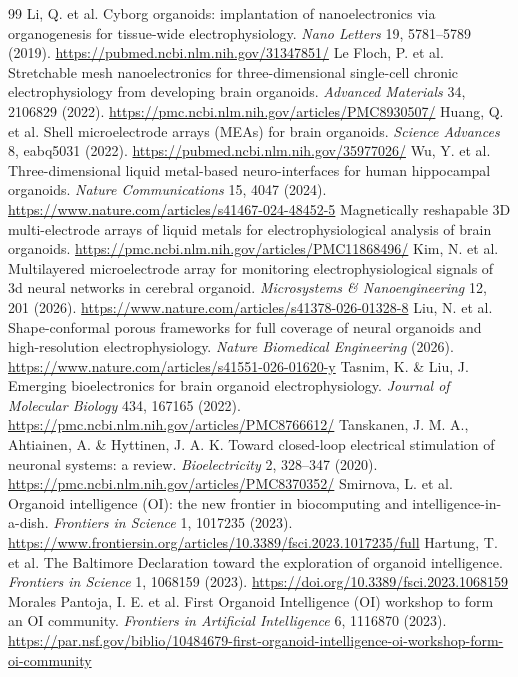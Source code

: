 \documentclass[10pt,twocolumn]{article}
\begin{document}
\begin{thebibliography}{99}
 Li, Q. et al. Cyborg organoids: implantation of nanoelectronics via organogenesis for tissue-wide electrophysiology. \emph{Nano Letters} 19, 5781--5789 (2019). \url{https://pubmed.ncbi.nlm.nih.gov/31347851/}
 Le Floch, P. et al. Stretchable mesh nanoelectronics for three-dimensional single-cell chronic electrophysiology from developing brain organoids. \emph{Advanced Materials} 34, 2106829 (2022). \url{https://pmc.ncbi.nlm.nih.gov/articles/PMC8930507/}
 Huang, Q. et al. Shell microelectrode arrays (MEAs) for brain organoids. \emph{Science Advances} 8, eabq5031 (2022). \url{https://pubmed.ncbi.nlm.nih.gov/35977026/}
 Wu, Y. et al. Three-dimensional liquid metal-based neuro-interfaces for human hippocampal organoids. \emph{Nature Communications} 15, 4047 (2024). \url{https://www.nature.com/articles/s41467-024-48452-5}
 Magnetically reshapable 3D multi-electrode arrays of liquid metals for electrophysiological analysis of brain organoids. \url{https://pmc.ncbi.nlm.nih.gov/articles/PMC11868496/}
 Kim, N. et al. Multilayered microelectrode array for monitoring electrophysiological signals of 3d neural networks in cerebral organoid. \emph{Microsystems \& Nanoengineering} 12, 201 (2026). \url{https://www.nature.com/articles/s41378-026-01328-8}
 Liu, N. et al. Shape-conformal porous frameworks for full coverage of neural organoids and high-resolution electrophysiology. \emph{Nature Biomedical Engineering} (2026). \url{https://www.nature.com/articles/s41551-026-01620-y}
 Tasnim, K. \& Liu, J. Emerging bioelectronics for brain organoid electrophysiology. \emph{Journal of Molecular Biology} 434, 167165 (2022). \url{https://pmc.ncbi.nlm.nih.gov/articles/PMC8766612/}
 Tanskanen, J. M. A., Ahtiainen, A. \& Hyttinen, J. A. K. Toward closed-loop electrical stimulation of neuronal systems: a review. \emph{Bioelectricity} 2, 328--347 (2020). \url{https://pmc.ncbi.nlm.nih.gov/articles/PMC8370352/}
 Smirnova, L. et al. Organoid intelligence (OI): the new frontier in biocomputing and intelligence-in-a-dish. \emph{Frontiers in Science} 1, 1017235 (2023). \url{https://www.frontiersin.org/articles/10.3389/fsci.2023.1017235/full}
 Hartung, T. et al. The Baltimore Declaration toward the exploration of organoid intelligence. \emph{Frontiers in Science} 1, 1068159 (2023). \url{https://doi.org/10.3389/fsci.2023.1068159}
 Morales Pantoja, I. E. et al. First Organoid Intelligence (OI) workshop to form an OI community. \emph{Frontiers in Artificial Intelligence} 6, 1116870 (2023). \url{https://par.nsf.gov/biblio/10484679-first-organoid-intelligence-oi-workshop-form-oi-community}

\end{thebibliography}
\end{document}
